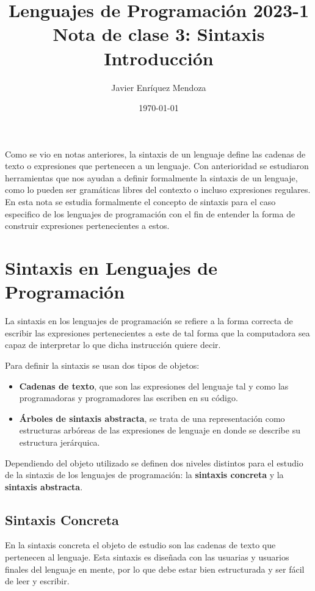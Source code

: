 \documentclass[12pt]{extarticle}
\title{\LARGE
Lenguajes de Programación 2023-1\\ 
Nota de clase 3: Sintaxis\\
\color{Orchid} Introducción}
\author{Javier Enríquez Mendoza}
\date{\today}
\begin{document}
\maketitle

Como se vio en notas anteriores, la sintaxis de un lenguaje define las cadenas de texto o expresiones que pertenecen a un lenguaje. Con anterioridad se estudiaron herramientas que nos ayudan a definir formalmente la sintaxis de un lenguaje, como lo pueden ser gramáticas libres del contexto o incluso expresiones regulares. En esta nota se estudia formalmente el concepto de sintaxis para el caso especifico de los lenguajes de programación con el fin de entender la forma de construir expresiones pertenecientes a estos.

\section{Sintaxis en Lenguajes de Programación}

La sintaxis en los lenguajes de programación se refiere a la forma correcta de escribir las expresiones pertenecientes a este de tal forma que la computadora sea capaz de interpretar lo que dicha instrucción quiere decir.

Para definir la sintaxis se usan dos tipos de objetos:
\begin{itemize}
    \item {\bf Cadenas de texto}, que son las expresiones del lenguaje tal y como las programadoras y programadores las escriben en su código.
    \item {\bf Árboles de sintaxis abstracta}, se trata de una representación como estructuras arbóreas de las expresiones de lenguaje  en donde se describe su estructura jerárquica. 
\end{itemize}

Dependiendo del objeto utilizado se definen dos niveles distintos para el estudio de la sintaxis de los lenguajes de programación: la {\bf sintaxis concreta} y la {\bf sintaxis abstracta}.

\subsection{Sintaxis Concreta}

En la sintaxis concreta el objeto de estudio son las cadenas de texto que pertenecen al lenguaje. Esta sintaxis es diseñada con las usuarias y usuarios finales del lenguaje en mente, por lo que debe estar bien estructurada y ser fácil de leer y escribir. 
\end{document}
